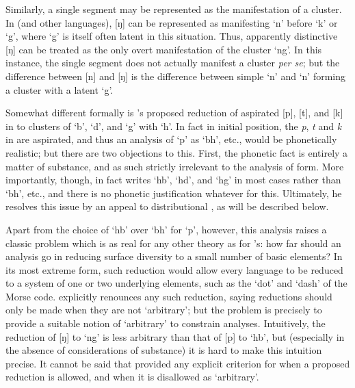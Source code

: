 Similarly, a single segment may be represented as the manifestation of
a cluster. In  (and other languages), {[ŋ]} can be represented
as manifesting `n' before `k' or `g', where `g' is itself often latent
in this situation. Thus, apparently distinctive {[ŋ]} can be treated
as the only overt manifestation of the cluster `ng'.  In this
instance, the single segment does not actually manifest a cluster \emph{per
se}; but the difference between {[n]} and {[ŋ]} is the difference
between simple `n' and `n' forming a cluster with a latent `g'.

Somewhat different formally is {\Hjelmslev}'s proposed reduction of
aspirated  {[p]}, {[t]}, and {[k]} in  to clusters of `b',
`d', and `g' with `h'. In fact in initial position, the 
\emph{p}, \emph{t} and \emph{k} in  are aspirated, and thus an
analysis of `p' as `bh', etc., would be phonetically realistic; but
there are two objections to this. First, the phonetic fact is entirely
a matter of substance, and as such strictly irrelevant to the analysis
of form. More importantly, though, {\Hjelmslev} in fact writes `hb',
`hd', and `hg' in most cases rather than `bh', etc., and there is no
phonetic justification whatever for this. Ultimately, he resolves this
issue by an appeal to distributional , as will be
described below.

Apart from the choice of `hb' over `bh' for `p', however, this
analysis raises a classic problem which is as real for any other
theory as for {\Hjelmslev}'s: how far should an analysis go in reducing
surface diversity to a small number of basic elements? In its most
extreme form, such reduction would allow every language to be reduced
to a system of one or two underlying elements, such as the `dot' and
`dash' of the Morse code. {\Hjelmslev} explicitly renounces any such
reduction, saying reductions should only be made when they are not
`arbitrary'; but the problem is precisely to provide a suitable notion
of `arbitrary' to constrain analyses. Intuitively, the reduction of
{[ŋ]} to `ng' is less arbitrary than that of {[p]} to `hb', but
(especially in the absence of considerations of substance) it is hard
to make this intuition precise. It cannot be said that {\Hjelmslev}
provided any explicit criterion for when a proposed reduction is
allowed, and when it is disallowed as `arbitrary'.

